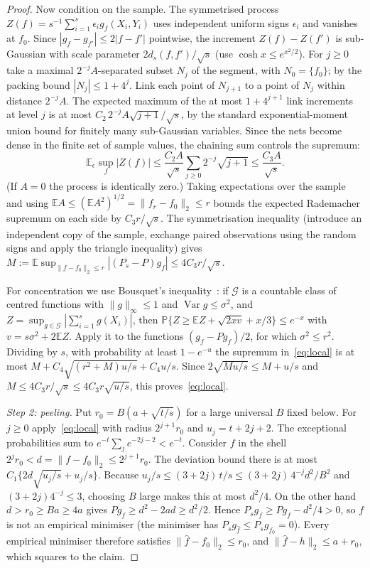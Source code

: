 \documentclass[11pt,a4paper]{article}
\theoremstyle{remark}
\newcommand{\E}{\mathbb E}
\newcommand{\PP}{\mathbb P}
\begin{document}
\begin{proof}
Now condition on the sample. The symmetrised process $Z(f)=s^{-1}\sum_{i=1}^s\epsilon_i g_f(X_i,Y_i)$ uses independent uniform signs $\epsilon_i$ and vanishes at $f_0$. Since $|g_f-g_{f'}|\le2|f-f'|$ pointwise, the increment $Z(f)-Z(f')$ is sub-Gaussian with scale parameter $2d_s(f,f')/\sqrt s$ (use $\cosh x\le e^{x^2/2}$). For $j\ge0$ take a maximal $2^{-j}A$-separated subset $N_j$ of the segment, with $N_0=\{f_0\}$; by the packing bound $|N_j|\le1+4^j$. Link each point of $N_{j+1}$ to a point of $N_j$ within distance $2^{-j}A$. The expected maximum of the at most $1+4^{j+1}$ link increments at level $j$ is at most $C_2\,2^{-j}A\sqrt{j+1}/\sqrt s$, by the standard exponential-moment union bound for finitely many sub-Gaussian variables. Since the nets become dense in the finite set of sample values, the chaining sum controls the supremum:
\[
 \E_\epsilon\sup_{f}|Z(f)|\le \frac{C_2A}{\sqrt s}\sum_{j\ge0}2^{-j}\sqrt{j+1}\le\frac{C_3A}{\sqrt s}.
\]
(If $A=0$ the process is identically zero.) Taking expectations over the sample and using $\E A\le(\E A^2)^{1/2}=\|f_r-f_0\|_2\le r$ bounds the expected Rademacher supremum on each side by $C_3r/\sqrt s$. The symmetrisation inequality (introduce an independent copy of the sample, exchange paired observations using the random signs and apply the triangle inequality) gives $M:=\E\sup_{\|f-f_0\|_2\le r}|(P_s-P)g_f|\le 4C_3r/\sqrt s$.

For concentration we use Bousquet's inequality~\cite[Theorem~2.3]{bousquet}: if $\mathcal G$ is a countable class of centred functions with $\|g\|_\infty\le1$ and $\operatorname{Var} g\le\sigma^2$, and $Z=\sup_{g\in\mathcal G}|\sum_{i=1}^s g(X_i)|$, then $\PP\{Z\ge\E Z+\sqrt{2xv}+x/3\}\le e^{-x}$ with $v=s\sigma^2+2\E Z$. Apply it to the functions $(g_f-Pg_f)/2$, for which $\sigma^2\le r^2$. Dividing by $s$, with probability at least $1-e^{-u}$ the supremum in~\eqref{eq:local} is at most $M+C_4\sqrt{(r^2+M)u/s}+C_4u/s$. Since $2\sqrt{Mu/s}\le M+u/s$ and $M\le4C_3r/\sqrt s\le 4C_3 r\sqrt{u/s}$, this proves~\eqref{eq:local}.

\emph{Step 2: peeling.} Put $r_0=B(a+\sqrt{t/s})$ for a large universal $B$ fixed below. For $j\ge0$ apply~\eqref{eq:local} with radius $2^{j+1}r_0$ and $u_j=t+2j+2$. The exceptional probabilities sum to $e^{-t}\sum_j e^{-2j-2}<e^{-t}$. Consider $f$ in the shell $2^jr_0<d=\|f-f_0\|_2\le2^{j+1}r_0$. The deviation bound there is at most $C_1\{2d\sqrt{u_j/s}+u_j/s\}$. Because $u_j/s\le (3+2j)\,t/s\le(3+2j)\,4^{-j}d^2/B^2$ and $(3+2j)4^{-j}\le3$, choosing $B$ large makes this at most $d^2/4$. On the other hand $d>r_0\ge Ba\ge4a$ gives $Pg_f\ge d^2-2ad\ge d^2/2$. Hence $P_sg_f\ge Pg_f-d^2/4>0$, so $f$ is not an empirical minimiser (the minimiser has $P_sg_{\widehat f}\le P_sg_{f_0}=0$). Every empirical minimiser therefore satisfies $\|\widehat f-f_0\|_2\le r_0$, and $\|\widehat f-h\|_2\le a+r_0$, which squares to the claim.
\end{proof}
\end{document}
